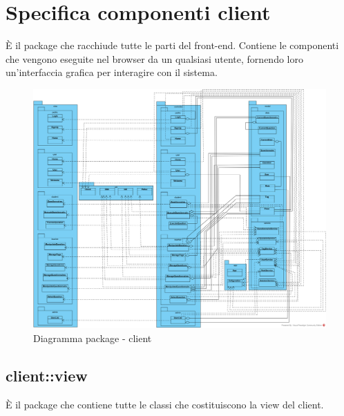 \section{Specifica componenti client}
È il package che racchiude tutte le parti del front-end. Contiene le componenti che vengono eseguite nel browser da un qualsiasi utente, fornendo loro un’interfaccia grafica per interagire con il sistema.\begin{center}
	\begin{figure}[H]
		\centering \includegraphics[scale=4, max width=\textwidth, max height=\myheight]{../img/diagrammiClassi/client.png}
		\caption{Diagramma package - client}
	\end{figure}
\end{center}\subsection{client::view}
È il package che contiene tutte le classi che costituiscono la view del client. 
